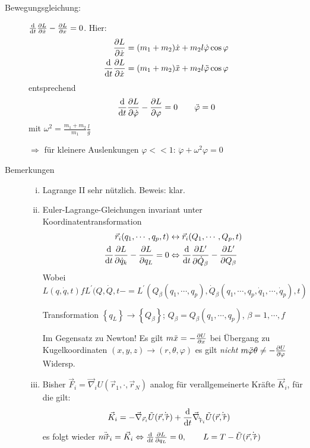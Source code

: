 \begin{enumerate}
\begin{description}
\item[Bewegungsgleichung:]
  $\frac{\text{d} }{\text{d} t}\frac{\partial L}{\partial \dot{x}} - \frac{\partial 
    L}{\partial x} = 0$.
  Hier:
\begin{align*}
  \frac{\partial L}{\partial \dot{x}}
  &= (m_1+m_2)\dot{x}+m_2l\dot{\varphi}\cos\varphi\\
  \frac{\text{d} }{\text{d} t}\frac{\partial L}{\partial \dot{x}}
  &= (m_1+m_2)\ddot{x} + m_2l\ddot{\varphi}\cos\varphi\\
\end{align*}
entsprechend
\begin{equation*}
\frac{\text{d} }{\text{d} t}\frac{\partial L}{\partial \dot{\varphi}}-\frac{\partial L}{\partial \varphi} = 0
\qquad \ddot{\varphi} = 0
\end{equation*}
mit $\omega^2=\frac{m_1+m_2}{m_1}\frac{l}{g}$

$\Rightarrow$ für kleinere Auslenkungen $\varphi<<1$: $\ddot{\varphi}+\omega^2\varphi=0$

\item[Bemerkungen]
\begin{enumerate}[i)]

\item Lagrange II sehr nützlich. Beweis: klar.

\item Euler-Lagrange-Gleichungen invariant unter
  Koordinatentransformation
  \begin{align*}
    \vec{r}_i(q_1,\cdots,q_p,t)
    &\leftrightarrow \vec{r}_i(Q_1,\cdots,Q_p,t)\\
    \frac{\text{d} }{\text{d} t}\frac{\partial L}{\partial \dot{q}_k}-\frac{\partial L}{\partial q_L} = 0
    &\Leftrightarrow \frac{\text{d} }{\text{d} t} \frac{\partial L^{\prime}}{\partial \dot{Q}_{\beta}}
      - \frac{\partial L^{\prime}}{\partial Q_{\beta}}
  \end{align*}
  Wobei
  $L(q,\dot{q},t) f L^{\prime}(Q,\dot{Q},t- =
  L^{\prime}(Q_{\beta}(q_1,\cdots,q_p),\dot{Q}_{\beta}(q_1,\cdots,q_p,
  \dot{q}_1,\cdots,\dot{q}_p),t)$

  Transformation
  $\left\{ q_L \right\} \rightarrow \left\{ Q_{\beta} \right\}$;
  $Q_{\beta}=Q_{\beta}(q_1,\cdots,q_p)$, $\beta = 1,\cdots,f$

  Im Gegensatz zu Newton!  Es gilt
  $m\ddot{x} = - \frac{\partial U}{\partial x}$ bei Übergang zu
  Kugelkoordinaten $(x,y,z)\rightarrow(r,\theta,\varphi)$ es gilt
  \emph{nicht}
  $m\ddot{\varphi} \theta \not= - \frac{\partial U}{\partial \varphi}$ Widersp.
\item Bisher $\vec{F}_i = \vec{\nabla}_iU(\vec{r}_1,\cdot,\vec{r}_N)$
  analog für verallgemeinerte Kräfte $\vec{K}_i$, für die gilt:
  \begin{align*}
    \vec{K}_i &= -\vec{\nabla}_{\vec{r}_i}\tilde{U}(\vec{r},\dot\vec{r})
                + \frac{\text{d} }{\text{d} t}\vec{\nabla}_{\dot\vec{r}_i} \tilde{U}(\vec{r},\dot\vec{r})
  \end{align*}
  es folgt wieder
  $m\ddot\vec{r}_i = \vec{K}_{i} \Leftrightarrow
  \frac{\text{d} }{\text{d} t}\frac{\partial L}{\partial q_L} = 0, \qquad L = T -
  \tilde{U}(\vec{r},\dot\vec{r})$


\end{enumerate}
\end{description}
\end{enumerate}
